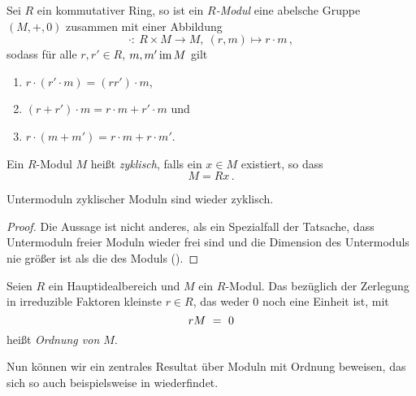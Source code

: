 \begin{definition}[Modul]
  Sei $R$ ein kommutativer Ring, so ist ein \emph{$R$-Modul}
  eine abelsche Gruppe $(M,+,0)$ zusammen mit einer 
  Abbildung 
  \[ \cdot:\ R \times M \to M,\ (r,m) \mapsto r\cdot m\,,\]
  sodass für alle $r, r' \in R$, $m,m' \operatorname{im} M$ gilt
  \begin{enumerate}
    \item $r\cdot (r'\cdot m) = (rr')\cdot m$,
    \item $(r+r')\cdot m = r\cdot m + r'\cdot m$ und 
    \item $r\cdot(m+m') = r\cdot m + r\cdot m'$.
  \end{enumerate}
\end{definition}


\begin{definition}
  Ein $R$-Modul $M$ heißt \emph{zyklisch}, falls
  ein $x\in M$ existiert, so dass
  \[ M = Rx\,.\]
\end{definition}


\begin{satz}
  \label{satz:untermoduln_bleiben_zyklisch}
  Untermoduln zyklischer Moduln sind wieder zyklisch.
\end{satz}
\begin{proof}
  Die Aussage ist nicht anderes, als ein Spezialfall der Tatsache, dass
  Untermoduln freier Moduln wieder frei sind und die Dimension des Untermoduls
  nie größer ist als die des Moduls 
  (\autocite[Theorem 7.1]{lang2002algebra}).
\end{proof}

\begin{definition}
  Seien $R$ ein Hauptidealbereich und $M$ ein $R$-Modul. 
  Das bezüglich der Zerlegung in irreduzible Faktoren kleinste 
  $r \in R$, das weder $0$ noch eine Einheit ist, mit
  \[ rM \ =\  0\]
  heißt \emph{Ordnung von $M$}.
\end{definition}

Nun können wir ein zentrales Resultat über Moduln mit Ordnung beweisen, das
sich so auch beispielsweise in \autocite[Lemma 8.10]{hartley1974rings}
wiederfindet.

